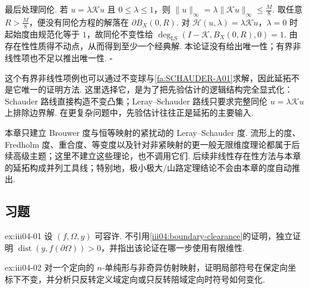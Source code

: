 \begin{FAProof}
最后处理同伦. 若 \(\displaystyle u=\lambda\mathcal Ku\) 且 \(\displaystyle0\leqslant\lambda\leqslant1\)，则
\(\displaystyle \|u\|_{\infty} = \lambda\|\mathcal Ku\|_{\infty} \leqslant \frac{M}{8}.\)
取任意 \(\displaystyle R>\frac{M}{8}\)，便没有同伦方程的解落在 \(\displaystyle\partial B_X(0,R)\). 对 \(\displaystyle\mathcal H(u,\lambda)=\lambda\mathcal Ku\)，\(\displaystyle\lambda=0\) 时起始度由规范化等于 \(\displaystyle1\)，故同伦不变性给
\(\displaystyle \deg_{\mathrm{LS}}(I-\mathcal K,B_X(0,R),0) = 1.\)
由存在性性质得不动点，从而得到至少一个经典解. 本论证没有给出唯一性；有界非线性项也不足以推出唯一性. \hfill\(\square\)
\end{FAProof}

\begin{FARemark}
这个有界非线性项例也可以通过不变球与\autoref{fa:SCHAUDER-A01}求解，因此延拓不是它唯一的证明方法. 这里选择它，是为了把先验估计的逻辑结构完全显式化：Schauder 路线直接构造不变凸集；Leray--Schauder 路线只要求完整同伦 \(\displaystyle u=\lambda\mathcal Ku\) 上排除边界解. 在更复杂问题中，先验估计往往正是延拓的主要输入.
\end{FARemark}

\begin{FARemark}[一般度理论的延后边界]
本章只建立 Brouwer 度与恒等映射的紧扰动的 Leray--Schauder 度. 流形上的度、Fredholm 度、重合度、等变度以及针对非紧映射的更一般无限维度理论都属于后续高级主题；这里不建立这些理论，也不调用它们. 后续非线性存在性方法与本章的延拓构成并列工具线；特别地，极小极大/山路定理结论不会由本章的度自动推出.
\end{FARemark}

\subsection{习题}

\begin{FAExercise}[有限维边界间隙]{ex:iii04-01}
设 \(\displaystyle(f,\Omega,y)\) 可容许. 不引用\autoref{iii04:boundary-clearance}的证明，独立证明 \(\displaystyle\operatorname{dist}(y,f(\partial\Omega))>0\)，并指出该论证在哪一步使用有限维性.
\end{FAExercise}

\begin{FAExercise}[定向符号]{ex:iii04-02}
对一个定向的 \(\displaystyle n\)-单纯形与非奇异仿射映射，证明局部符号在保定向坐标下不变，并分析只反转定义域定向或只反转陪域定向时符号如何变化.
\end{FAExercise}

